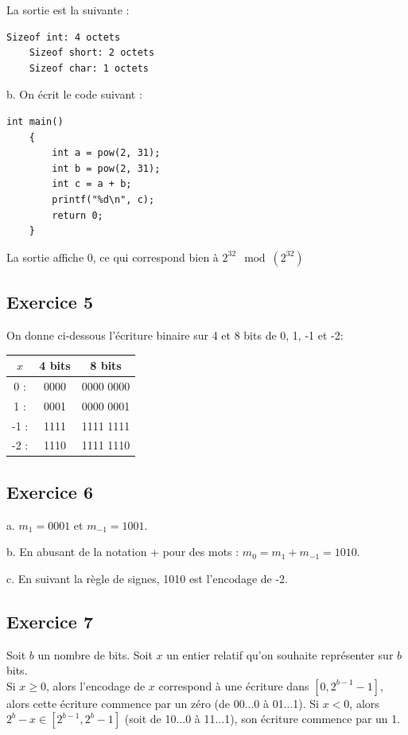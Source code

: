 \documentclass[11pt, a4 paper]{article}
\begin{document}
La sortie est la suivante :\\
\begin{lstlisting}[style=CStyle]
    Sizeof int: 4 octets
    Sizeof short: 2 octets
    Sizeof char: 1 octets
\end{lstlisting}

b. On écrit le code suivant :
\begin{lstlisting}[style=CStyle]
int main()
    {
        int a = pow(2, 31);
        int b = pow(2, 31);
        int c = a + b;
        printf("%d\n", c);
        return 0;
    }
\end{lstlisting}

La sortie affiche 0, ce qui correspond bien à $2^{32} \mod(2^{32})$

\subsection{Exercice 5}
On donne ci-dessous l'écriture binaire sur 4 et 8 bits de 0, 1, -1 et -2:
\begin{center}
    \begin{tabular}{c | c | c} 
    $x$ & 4 bits & 8 bits\\
        \hline
        \hline
    0 :& 0000 & 0000 0000\\ 
    1 :& 0001 & 0000 0001\\
    -1 :& 1111 & 1111 1111\\
    -2 :& 1110 & 1111 1110\\
     \hline
    \end{tabular}
\end{center}

\subsection{Exercice 6}
a. $m_1 = 0001$ et $m_{-1} = 1001$.

b. En abusant de la notation + pour des mots : $m_0 = m_1 + m_{-1} = 1010$.

c. En suivant la règle de signes, 1010 est l'encodage de -2.

\subsection{Exercice 7}
Soit $b$ un nombre de bits. Soit $x$ un entier relatif qu'on souhaite représenter sur $b$ bits.\\
Si $x \geq 0$, alors l'encodage de $x$ correspond à une écriture dans $[0, 2^{b-1}-1]$, alors cette écriture commence par un zéro (de 00...0 à 01...1).
Si $x < 0$, alors $2^b - x \in [2^{b-1}, 2^b-1]$ (soit de 10...0 à 11...1), son écriture commence par un 1.
\end{document}
